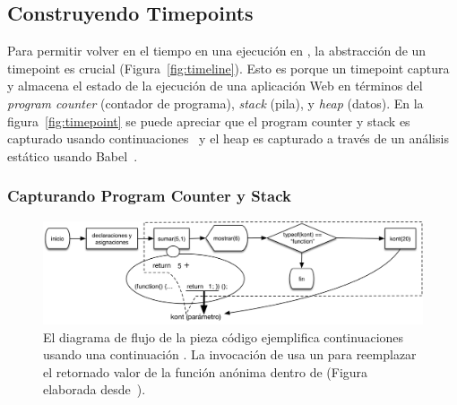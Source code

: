 \documentclass[conference]{IEEEtran}
\begin{document}
\subsection{Construyendo Timepoints}
\label{sec:ctime}



Para permitir volver en el tiempo en una ejecuci\'on en \deloreanjs, la abstracci\'on de un timepoint es crucial (Figura~\ref{fig:timeline}). Esto es porque un timepoint captura y almacena el estado de la ejecuci\'on de una aplicaci\'on Web en t\'erminos del {\em program counter} (contador de programa), {\em stack} (pila), y {\em heap} (datos). En la figura~\ref{fig:timepoint} se puede apreciar que el program counter y stack es capturado usando continuaciones~\cite{fw84} y el heap es capturado a trav\'es de un an\'alisis est\'atico usando Babel~\cite{mckenzie:babel}.        
  
 \smallskip

\subsubsection{Capturando Program Counter y Stack}
\label{sec:continuaciones}

\begin{figure}[t]
\begin{center}
\includegraphics[width=.8\linewidth]{fig-kont}
\caption{El diagrama de flujo de la pieza c\'odigo ejemplifica continuaciones usando una continuaci\'on . La invocaci\'on de  usa un  para reemplazar el retornado valor de la funci\'on an\'onima dentro de  (Figura elaborada desde~\cite{legerFukuda:sac-se2017}).}  

\label{fig:kont}
\end{center}
\end{figure}

\end{document}
